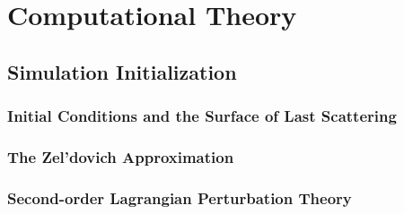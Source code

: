 
%
%

\section{Computational Theory}
\label{sec:computational_theory}





\subsection{Simulation Initialization}
\label{subsec:simulation_initialization}



\subsubsection{Initial Conditions and the Surface of Last Scattering}
\label{subsubsec:initial_conditions}



\subsubsection{The Zel'dovich Approximation}
\label{subsubsec:za_theory}



\subsubsection{Second-order Lagrangian Perturbation Theory}
\label{subsubsec:2lpt_theory}




